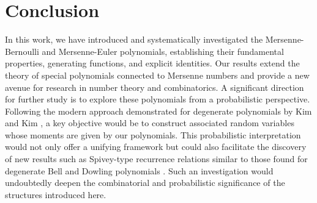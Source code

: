 \documentclass[12pt, a4paper]{article}
\begin{document}
\section{Conclusion}
In this work, we have introduced and systematically investigated the Mersenne-Bernoulli and Mersenne-Euler polynomials, establishing their fundamental properties, generating functions, and explicit identities. Our results extend the theory of special polynomials connected to Mersenne numbers and provide a new avenue for research in number theory and combinatorics. A significant direction for further study is to explore these polynomials from a probabilistic perspective. Following the modern approach demonstrated for degenerate polynomials by Kim and Kim \cite{KK1,KK2}, a key objective would be to construct associated random variables whose moments are given by our polynomials. This probabilistic interpretation would not only offer a unifying framework but could also facilitate the discovery of new results such as Spivey-type recurrence relations similar to those found for degenerate Bell and Dowling polynomials \cite{KK3,KK4}. Such an investigation would undoubtedly deepen the combinatorial and probabilistic significance of the structures introduced here.
\end{document}
